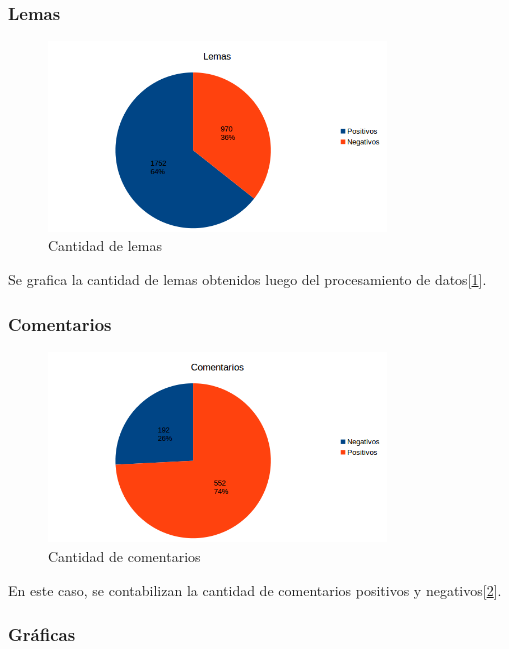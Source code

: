 \documentclass[12pt]{article}
\begin{document}
\subsubsection{Lemas}
\begin{figure}[!h]
  \centering
    \includegraphics[width=0.8\textwidth]{./fig/Lemas.png}
  \caption{Cantidad de lemas}
  \label{fig:lemas}
\end{figure} 
Se grafica la cantidad de lemas obtenidos luego del procesamiento de datos[\ref{fig:lemas}].

\subsubsection{Comentarios}
\begin{figure}[!h]
  \centering
    \includegraphics[width=0.8\textwidth]{./fig/Comentarios.png}
  \caption{Cantidad de comentarios}
  \label{fig:com}
\end{figure} 
En este caso, se contabilizan la cantidad de comentarios positivos y negativos[\ref{fig:com}].

\subsubsection{Gráficas}
\end{document}
